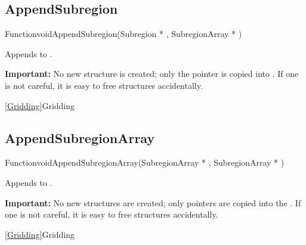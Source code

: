 
\newpage
\subsection{AppendSubregion}
\label{AppendSubregion}


\begin{deftypefn}{Function}{void}{AppendSubregion}({Subregion *} , {SubregionArray *} )

\DESCRIPTION
Appends  to .

\NOTES
{\bf Important:}
No new  structure is created; only the pointer
is copied into .
If one is not careful, it is easy to free  structures
accidentally.

\SEEALSO
\vref{Gridding}{Gridding}

\end{deftypefn}


\newpage
\subsection{AppendSubregionArray}
\label{AppendSubregionArray}


\begin{deftypefn}{Function}{void}{AppendSubregionArray}({SubregionArray *} , {SubregionArray *} )

\DESCRIPTION
Appends  to .

\NOTES
{\bf Important:}
No new  structures are created; only pointers
are copied into the .
If one is not careful, it is easy to free  structures
accidentally.

\SEEALSO
\vref{Gridding}{Gridding}

\end{deftypefn}

